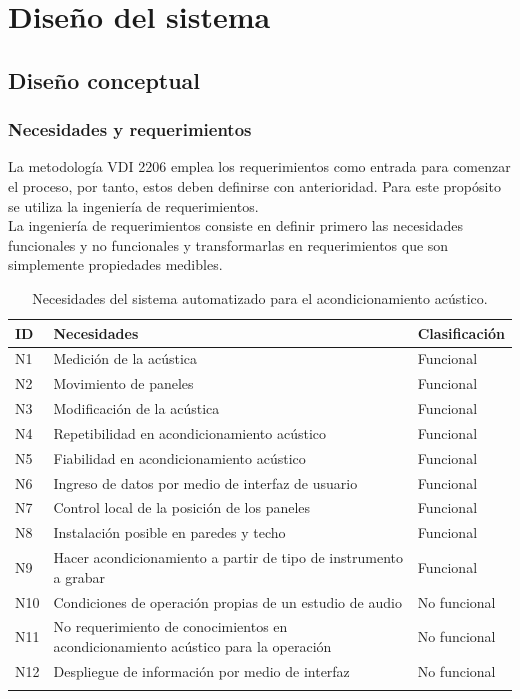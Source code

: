 \section{Diseño del sistema}
\subsection{Diseño conceptual}
\subsubsection{Necesidades y requerimientos}
La metodología VDI 2206 emplea los requerimientos como entrada para comenzar el proceso, por tanto, estos deben definirse con anterioridad. Para este propósito se utiliza la ingeniería de requerimientos.
\\
La ingeniería de requerimientos consiste en definir primero las necesidades funcionales y no funcionales y transformarlas en requerimientos que son simplemente propiedades medibles.

\begin{center}
\footnotesize
    \begin{longtable}[!htb]{| m{3em} | m{30em} | m{6em}|}
    \hline
    \textbf{ID}& \textbf{Necesidades} & \textbf{Clasificaci\'on}\\
    \hline \hline
    N1 & Medici\'on de la ac\'ustica & Funcional\\
    \hline
    N2 & Movimiento de paneles & Funcional\\
    \hline
    N3 & Modificación de la acústica & Funcional\\
    \hline
    N4 & Repetibilidad en acondicionamiento acústico & Funcional\\
    \hline
    N5 & Fiabilidad en acondicionamiento acústico & Funcional\\
    \hline
    N6 & Ingreso de datos por medio de interfaz de usuario & Funcional\\
    \hline
    N7 & Control local de la posición de los paneles & Funcional\\
    \hline
    N8 & Instalación posible en paredes y techo & Funcional\\
    \hline
    N9 & Hacer acondicionamiento a partir de tipo de instrumento a grabar & Funcional\\
    \hline
    N10 & Condiciones de operación propias de un estudio de audio & No funcional\\
    \hline
    N11 & No requerimiento de conocimientos en acondicionamiento acústico para la operación & No funcional \\
    \hline
    N12 & Despliegue de información por medio de interfaz & No funcional\\
    \hline

    \caption{Necesidades del sistema automatizado para el acondicionamiento acústico.}
    \label{tab:Necesidades}
    \end{longtable}
\end{center}

